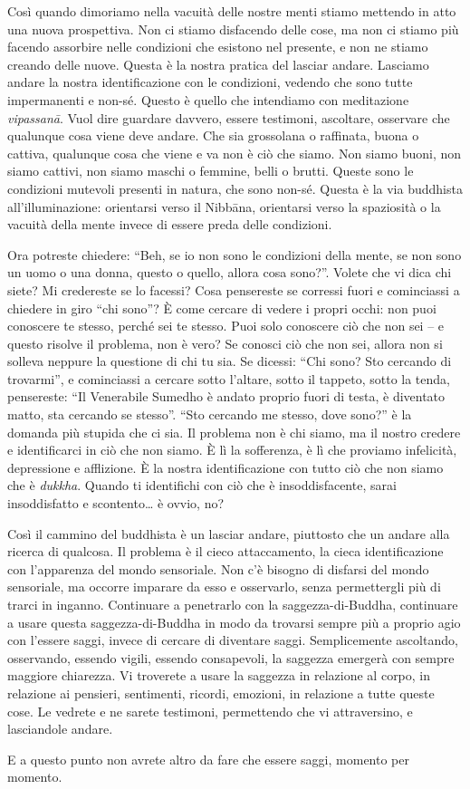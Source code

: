 Così quando dimoriamo nella vacuità delle nostre menti stiamo mettendo
in atto una nuova prospettiva. Non ci stiamo disfacendo delle cose, ma
non ci stiamo più facendo assorbire nelle condizioni che esistono nel
presente, e non ne stiamo creando delle nuove. Questa è la nostra
pratica del lasciar andare. Lasciamo andare la nostra identificazione
con le condizioni, vedendo che sono tutte impermanenti e non-sé. Questo
è quello che intendiamo con meditazione \emph{vipassanā}. Vuol dire
guardare davvero, essere testimoni, ascoltare, osservare che qualunque
cosa viene deve andare. Che sia grossolana o raffinata, buona o cattiva,
qualunque cosa che viene e va non è ciò che siamo. Non siamo buoni, non
siamo cattivi, non siamo maschi o femmine, belli o brutti. Queste sono
le condizioni mutevoli presenti in natura, che sono non-sé. Questa è la
via buddhista all'illuminazione: orientarsi verso il Nibbāna, orientarsi
verso la spaziosità o la vacuità della mente invece di essere preda
delle condizioni.

Ora potreste chiedere: ``Beh, se io non sono le condizioni della mente,
se non sono un uomo o una donna, questo o quello, allora cosa sono?''.
Volete che vi dica chi siete? Mi credereste se lo facessi? Cosa
pensereste se corressi fuori e cominciassi a chiedere in giro ``chi
sono''? È come cercare di vedere i propri occhi: non puoi conoscere te
stesso, perché sei te stesso. Puoi solo conoscere ciò che non sei -- e
questo risolve il problema, non è vero? Se conosci ciò che non sei,
allora non si solleva neppure la questione di chi tu sia. Se dicessi:
``Chi sono? Sto cercando di trovarmi'', e cominciassi a cercare sotto
l'altare, sotto il tappeto, sotto la tenda, pensereste: ``Il Venerabile
Sumedho è andato proprio fuori di testa, è diventato matto, sta cercando
se stesso''. ``Sto cercando me stesso, dove sono?'' è la domanda più
stupida che ci sia. Il problema non è chi siamo, ma il nostro credere e
identificarci in ciò che non siamo. È lì la sofferenza, è lì che
proviamo infelicità, depressione e afflizione. È la nostra
identificazione con tutto ciò che non siamo che è \emph{dukkha}. Quando
ti identifichi con ciò che è insoddisfacente, sarai insoddisfatto e
scontento\ldots{} è ovvio, no?

Così il cammino del buddhista è un lasciar andare, piuttosto che un
andare alla ricerca di qualcosa. Il problema è il cieco attaccamento, la
cieca identificazione con l'apparenza del mondo sensoriale. Non c'è
bisogno di disfarsi del mondo sensoriale, ma occorre imparare da esso e
osservarlo, senza permettergli più di trarci in inganno. Continuare a
penetrarlo con la saggezza-di-Buddha, continuare a usare questa
saggezza-di-Buddha in modo da trovarsi sempre più a proprio agio con
l'essere saggi, invece di cercare di diventare saggi. Semplicemente
ascoltando, osservando, essendo vigili, essendo consapevoli, la saggezza
emergerà con sempre maggiore chiarezza. Vi troverete a usare la saggezza
in relazione al corpo, in relazione ai pensieri, sentimenti, ricordi,
emozioni, in relazione a tutte queste cose. Le vedrete e ne sarete
testimoni, permettendo che vi attraversino, e lasciandole andare.

E a questo punto non avrete altro da fare che essere saggi, momento per
momento.